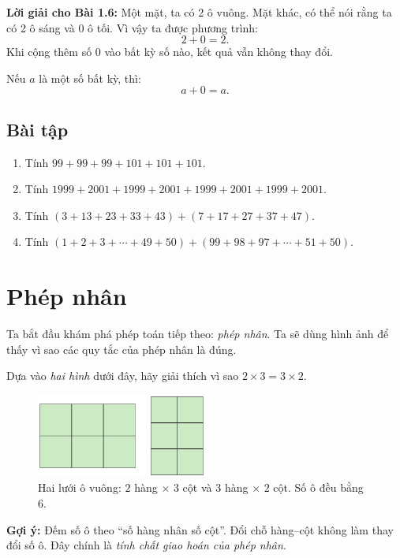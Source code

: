 \noindent\textbf{Lời giải cho Bài 1.6:}  
Một mặt, ta có 2 ô vuông.  
Mặt khác, có thể nói rằng ta có 2 ô sáng và 0 ô tối.  
Vì vậy ta được phương trình:
\[
2 + 0 = 2.
\]
Khi cộng thêm số 0 vào bất kỳ số nào, kết quả vẫn không thay đổi.

\begin{tcolorbox}[colback=yellow!10!white, colframe=orange!80!black,
title={Tính chất cộng với số không}]
Nếu \(a\) là một số bất kỳ, thì:
\[
a + 0 = a.
\]
\end{tcolorbox}

\subsection*{Bài tập}
\begin{enumerate}[label=1.2.\arabic*.]
  \item Tính \(99+99+99+101+101+101\).
  \item Tính \(1999+2001+1999+2001+1999+2001+1999+2001\).
  \item Tính \((3+13+23+33+43)+(7+17+27+37+47)\).
  \item Tính \((1+2+3+\cdots+49+50)+(99+98+97+\cdots+51+50)\).
\end{enumerate}


\section{Phép nhân}

\noindent Ta bắt đầu khám phá phép toán tiếp theo: \emph{phép nhân}.
Ta sẽ dùng hình ảnh để thấy vì sao các quy tắc của phép nhân là đúng.

\begin{problem}[1.7]
Dựa vào \emph{hai hình} dưới đây, hãy giải thích vì sao \(2\times3=3\times2\).

\begin{figure}[ht!]
  \centering
  \includegraphics[width=0.50\textwidth]{img/fig-prob1.7.pdf}
  \caption*{\small Hai lưới ô vuông: \(2\) hàng \(\times\) \(3\) cột và \(3\) hàng \(\times\) \(2\) cột.
  Số ô đều bằng \(6\).}
\end{figure}

\textbf{Gợi ý:} Đếm số ô theo “số hàng nhân số cột”. Đổi chỗ hàng–cột
không làm thay đổi số ô. Đây chính là \emph{tính chất giao hoán của phép nhân}.
\end{problem}

